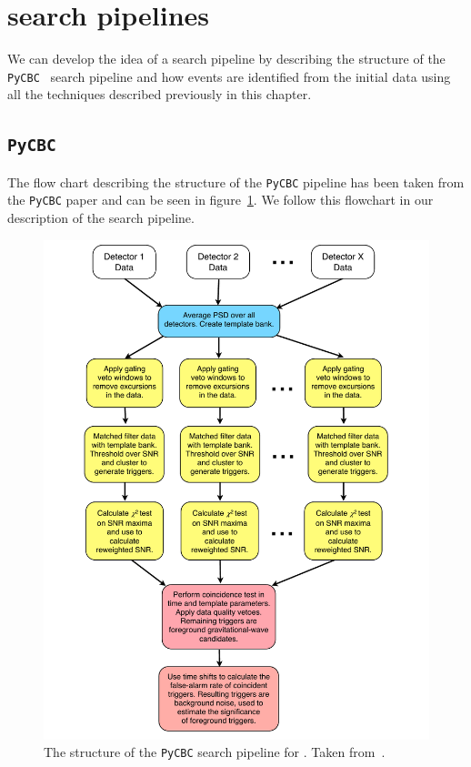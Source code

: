 \section{\label{2:sec:gw-pipelines}\Gwadj search pipelines}

We can develop the idea of a \gwadj search pipeline by describing the structure of the \texttt{PyCBC}~\cite{PyCBC:2016} search pipeline and how \gwadj events are identified from the initial \gwadj data using all the techniques described previously in this chapter.

\subsection{\label{2:sec:searching-for-gw-with-pycbc}\texttt{PyCBC}}
The flow chart describing the structure of the \texttt{PyCBC} pipeline has been taken from the \texttt{PyCBC} paper and can be seen in figure~\ref{2:fig:pycbc-flowchart}. We follow this flowchart in our description of the search pipeline.
%
\begin{figure}
    \centering
    \includegraphics[width=1.0\linewidth]{images/2_searches/pycbc_flowchart.pdf}
    \caption{The structure of the \texttt{PyCBC} search pipeline for \gws. Taken from~\cite{PyCBC:2016}.}
    \label{2:fig:pycbc-flowchart}
\end{figure}







